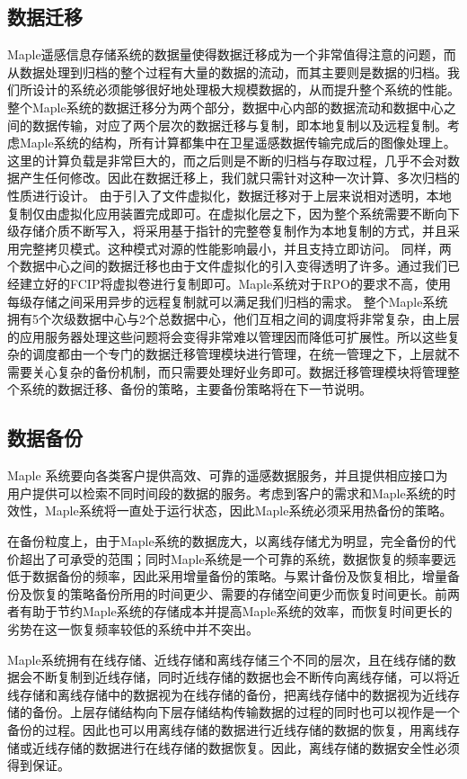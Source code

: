 \documentclass{article}
\begin{document}
\subsection{数据迁移}
Maple遥感信息存储系统的数据量使得数据迁移成为一个非常值得注意的问题，而从数据处理到归档的整个过程有大量的数据的流动，而其主要则是数据的归档。我们所设计的系统必须能够很好地处理极大规模数据的，从而提升整个系统的性能。整个Maple系统的数据迁移分为两个部分，数据中心内部的数据流动和数据中心之间的数据传输，对应了两个层次的数据迁移与复制，即本地复制以及远程复制。考虑Maple系统的结构，所有计算都集中在卫星遥感数据传输完成后的图像处理上。这里的计算负载是非常巨大的，而之后则是不断的归档与存取过程，几乎不会对数据产生任何修改。因此在数据迁移上，我们就只需针对这种一次计算、多次归档的性质进行设计。
由于引入了文件虚拟化，数据迁移对于上层来说相对透明，本地复制仅由虚拟化应用装置完成即可。在虚拟化层之下，因为整个系统需要不断向下级存储介质不断写入，将采用基于指针的完整卷复制作为本地复制的方式，并且采用完整拷贝模式。这种模式对源的性能影响最小，并且支持立即访问。
同样，两个数据中心之间的数据迁移也由于文件虚拟化的引入变得透明了许多。通过我们已经建立好的FCIP将虚拟卷进行复制即可。Maple系统对于RPO的要求不高，使用每级存储之间采用异步的远程复制就可以满足我们归档的需求。
整个Maple系统拥有5个次级数据中心与2个总数据中心，他们互相之间的调度将非常复杂，由上层的应用服务器处理这些问题将会变得非常难以管理因而降低可扩展性。所以这些复杂的调度都由一个专门的数据迁移管理模块进行管理，在统一管理之下，上层就不需要关心复杂的备份机制，而只需要处理好业务即可。数据迁移管理模块将管理整个系统的数据迁移、备份的策略，主要备份策略将在下一节说明。



\subsection{数据备份}
Maple 系统要向各类客户提供高效、可靠的遥感数据服务，并且提供相应接口为用户提供可以检索不同时间段的数据的服务。考虑到客户的需求和Maple系统的时效性，Maple系统将一直处于运行状态，因此Maple系统必须采用热备份的策略。

在备份粒度上，由于Maple系统的数据庞大，以离线存储尤为明显，完全备份的代价超出了可承受的范围；同时Maple系统是一个可靠的系统，数据恢复的频率要远低于数据备份的频率，因此采用增量备份的策略。与累计备份及恢复相比，增量备份及恢复的策略备份所用的时间更少、需要的存储空间更少而恢复时间更长。前两者有助于节约Maple系统的存储成本并提高Maple系统的效率，而恢复时间更长的劣势在这一恢复频率较低的系统中并不突出。

Maple系统拥有在线存储、近线存储和离线存储三个不同的层次，且在线存储的数据会不断复制到近线存储，同时近线存储的数据也会不断传向离线存储，可以将近线存储和离线存储中的数据视为在线存储的备份，把离线存储中的数据视为近线存储的备份。上层存储结构向下层存储结构传输数据的过程的同时也可以视作是一个备份的过程。因此也可以用离线存储的数据进行近线存储的数据的恢复，用离线存储或近线存储的数据进行在线存储的数据恢复。因此，离线存储的数据安全性必须得到保证。
\end{document}
